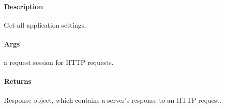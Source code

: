 \documentclass[letterpaper,10pt,english]{sphinxmanual}
\begin{document}
\begin{fulllineitems}
\label{\detokenize{gemini_lidar_hub_API:gemini_lidar_hub_API.get_lidar_hub_all_settings}}
\pysigstartsignatures
{}
\pysigstopsignatures

\paragraph{Description}
\label{\detokenize{gemini_lidar_hub_API:id2}}
\sphinxAtStartPar
Get all application settings.


\paragraph{Args}
\label{\detokenize{gemini_lidar_hub_API:id3}}\begin{description}
\sphinxAtStartPar
a request session for HTTP requests.

\end{description}


\paragraph{Returns}
\label{\detokenize{gemini_lidar_hub_API:id4}}\begin{description}
\sphinxAtStartPar
Response object, which contains a server’s response to an HTTP request.

\end{description}

\end{fulllineitems}

\end{document}
